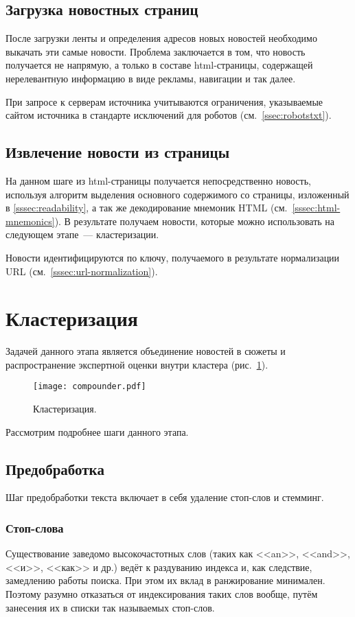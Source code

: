 \subsection{Загрузка новостных страниц}
После загрузки ленты и определения адресов новых новостей необходимо выкачать эти самые новости. Проблема заключается в том, что новость получается не напрямую, а только в составе html-страницы, содержащей нерелевантную информацию в виде рекламы, навигации и так далее.

При запросе к серверам источника учитываются ограничения, указываемые сайтом источника в стандарте исключений для роботов (см.~\ref{ssec:robotstxt}).

\subsection{Извлечение новости из страницы}
На данном шаге из html-страницы получается непосредственно новость, используя алгоритм выделения основного содержимого со страницы, изложенный в \ref{sssec:readability}, а так же декодирование мнемоник HTML (см.~\ref{sssec:html-mnemonics}). В результате получаем новости, которые можно использовать на следующем этапе~--- кластеризации.

Новости идентифицируются по ключу, получаемого в результате нормализации URL (см.~\ref{sssec:url-normalization}).

\section{Кластеризация}
Задачей данного этапа является объединение новостей в сюжеты и распространение экспертной оценки внутри кластера (рис.~\ref{fig:compounder}).

\begin{figure}[h]
    \centering
    \texttt{[image: compounder.pdf]}
    \caption{Кластеризация.}
    \label{fig:compounder}
\end{figure}

Рассмотрим подробнее шаги данного этапа.

\subsection{Предобработка}
Шаг предобработки текста включает в себя удаление стоп-слов и стемминг.

\subsubsection{Стоп-слова}
Существование заведомо высокочастотных слов (таких как <<an>>, <<and>>, <<и>>, <<как>> и др.) ведёт к раздуванию индекса и, как следствие, замедлению работы поиска. При этом их вклад в ранжирование минимален. Поэтому разумно отказаться от индексирования таких слов вообще, путём занесения их в списки так называемых стоп-слов.


